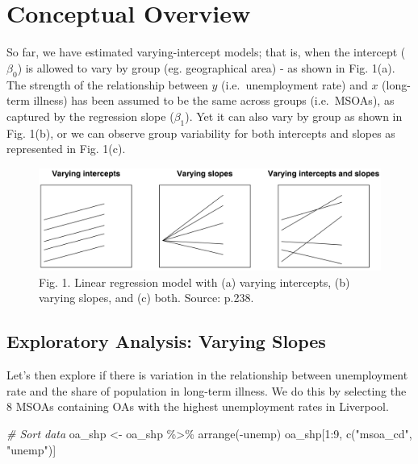 \documentclass[
]{book}
\newenvironment{Shaded}{\begin{snugshade}}{\end{snugshade}}
\newcommand{\CommentTok}[1]{\textcolor[rgb]{0.56,0.35,0.01}{\textit{#1}}}
\newcommand{\DecValTok}[1]{\textcolor[rgb]{0.00,0.00,0.81}{#1}}
\newcommand{\FunctionTok}[1]{\textcolor[rgb]{0.00,0.00,0.00}{#1}}
\newcommand{\NormalTok}[1]{#1}
\newcommand{\OtherTok}[1]{\textcolor[rgb]{0.56,0.35,0.01}{#1}}
\newcommand{\SpecialCharTok}[1]{\textcolor[rgb]{0.00,0.00,0.00}{#1}}
\newcommand{\StringTok}[1]{\textcolor[rgb]{0.31,0.60,0.02}{#1}}
\begin{document}
\hypertarget{conceptual-overview}{%
\section{Conceptual Overview}\label{conceptual-overview}}

So far, we have estimated varying-intercept models; that is, when the intercept (\(\beta_{0}\)) is allowed to vary by group (eg. geographical area) - as shown in Fig. 1(a). The strength of the relationship between \(y\) (i.e.~unemployment rate) and \(x\) (long-term illness) has been assumed to be the same across groups (i.e.~MSOAs), as captured by the regression slope (\(\beta_{1}\)). Yet it can also vary by group as shown in Fig. 1(b), or we can observe group variability for both intercepts and slopes as represented in Fig. 1(c).

\begin{figure}
\centering
\includegraphics{figs/ch6/fig11.1_Gelman_Hill.png}
\caption{Fig. 1. Linear regression model with (a) varying intercepts, (b) varying slopes, and (c) both. Source: \citet{Gelman_Hill_2006_book} p.238.}
\end{figure}

\hypertarget{exploratory-analysis-varying-slopes}{%
\subsection{Exploratory Analysis: Varying Slopes}\label{exploratory-analysis-varying-slopes}}

Let's then explore if there is variation in the relationship between unemployment rate and the share of population in long-term illness. We do this by selecting the 8 MSOAs containing OAs with the highest unemployment rates in Liverpool.

\begin{Shaded}
\begin{Highlighting}[]
\CommentTok{\# Sort data }
\NormalTok{oa\_shp }\OtherTok{\textless{}{-}}\NormalTok{ oa\_shp }\SpecialCharTok{\%\textgreater{}\%} \FunctionTok{arrange}\NormalTok{(}\SpecialCharTok{{-}}\NormalTok{unemp)}
\NormalTok{oa\_shp[}\DecValTok{1}\SpecialCharTok{:}\DecValTok{9}\NormalTok{, }\FunctionTok{c}\NormalTok{(}\StringTok{"msoa\_cd"}\NormalTok{, }\StringTok{"unemp"}\NormalTok{)]}
\end{Highlighting}
\end{Shaded}
\end{document}
